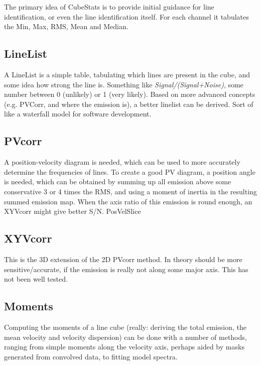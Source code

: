 \documentclass{article}
\begin{document}
The primary idea of CubeStats is to provide initial guidance for line
identification, or even the line identification itself. For each
channel it tabulates the Min, Max, RMS, Mean and Median.

\subsection{LineList}

A LineList is a simple table, tabulating which lines are present
in the cube, and some idea how strong the line is. Something like
{\it Signal/(Signal+Noise)}, some number between 0 (unlikely) or 1 
(very likely). Based on more advanced concepts (e.g. PVCorr, 
and where the emission is), a better linelist can be derived. Sort
of like a waterfall model for software development.



\subsection{PVcorr}

A position-velocity diagram is needed, which can be used to more
accurately determine the frequencies of lines.  To create a good
PV diagram, a position angle is needed, which can be obtained
by summing up all emission above some conservative 3 or 4 times
the RMS, and using a moment of inertia in the resulting summed
emission map.  When the axis ratio of this emission is round
enough, an XYVcorr might give better S/N.  PosVelSlice

\subsection{XYVcorr}

This is the 3D extension of the 2D PVcorr method. In theory should be
more sensitive/accurate, if the emission is really not along some
major axis. This has not been well tested.

\subsection{Moments}

Computing the moments of a line cube (really: deriving the total
emission, the mean velocity and velocity dispersion) can be done
with a number of methods, ranging from simple moments along the
velocity axis, perhaps aided by masks generated from convolved
data, to fitting model spectra.
\end{document}

